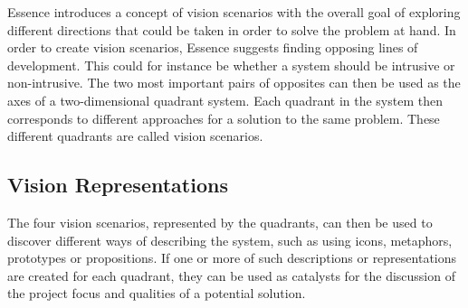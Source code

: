 Essence introduces a concept of vision scenarios with the overall goal of exploring different directions that could be taken in order to solve the problem at hand. In order to create vision scenarios, Essence suggests finding opposing lines of development. This could for instance be whether a system should be intrusive or non-intrusive. The two most important pairs of opposites can then be used as the axes of a two-dimensional quadrant system. Each quadrant in the system then corresponds to different approaches for a solution to the same problem. These different quadrants are called vision scenarios.

\subsection{Vision Representations}
\label{sub:vision_representations}

The four vision scenarios, represented by the quadrants, can then be used to discover different ways of describing the system, such as using icons, metaphors, prototypes or propositions. If one or more of such descriptions or representations are created for each quadrant, they can be used as catalysts for the discussion of the project focus and qualities of a potential solution. 



